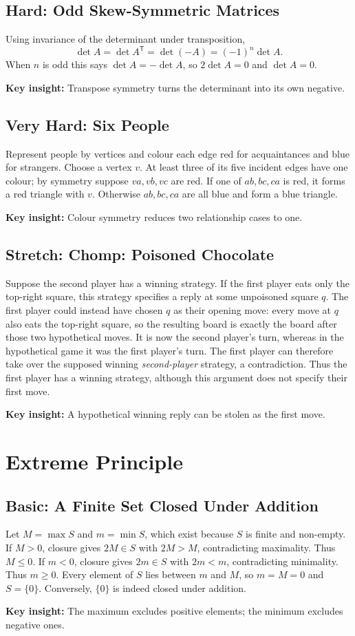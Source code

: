 \documentclass[12pt]{article}
\newcommand{\insight}[1]{\par\medskip\noindent\textbf{Key insight:} #1}
\begin{document}
\subsection*{Hard: Odd Skew-Symmetric Matrices}
Using invariance of the determinant under transposition,
\[
\det A=\det A^{\mathsf T}=\det(-A)=(-1)^n\det A.
\]
When $n$ is odd this says $\det A=-\det A$, so $2\det A=0$ and
$\det A=0$.
\insight{Transpose symmetry turns the determinant into its own negative.}

\subsection*{Very Hard: Six People}
Represent people by vertices and colour each edge red for acquaintances
and blue for strangers. Choose a vertex $v$. At least three of its
five incident edges have one colour; by symmetry suppose $va,vb,vc$
are red. If one of $ab,bc,ca$ is red, it forms a red triangle with
$v$. Otherwise $ab,bc,ca$ are all blue and form a blue triangle.
\insight{Colour symmetry reduces two relationship cases to one.}

\subsection*{Stretch: Chomp: Poisoned Chocolate}
Suppose the second player has a winning strategy. If the first player
eats only the top-right square, this strategy specifies a reply at
some unpoisoned square $q$. The first player could instead have chosen
$q$ as their opening move: every move at $q$ also eats the top-right
square, so the resulting board is exactly the board after those two
hypothetical moves. It is now the second player's turn, whereas in the
hypothetical game it was the first player's turn. The first player
can therefore take over the supposed winning \emph{second-player}
strategy, a contradiction. Thus the first player has a winning
strategy, although this argument does not specify their first move.
\insight{A hypothetical winning reply can be stolen as the first move.}

\section{Extreme Principle}

\subsection*{Basic: A Finite Set Closed Under Addition}
Let $M=\max S$ and $m=\min S$, which exist because $S$ is finite and
non-empty. If $M>0$, closure gives $2M\in S$ with $2M>M$, contradicting
maximality. Thus $M\le0$. If $m<0$, closure gives $2m\in S$ with
$2m<m$, contradicting minimality. Thus $m\ge0$. Every element of $S$
lies between $m$ and $M$, so $m=M=0$ and $S=\{0\}$. Conversely,
$\{0\}$ is indeed closed under addition.
\insight{The maximum excludes positive elements; the minimum excludes negative ones.}
\end{document}
